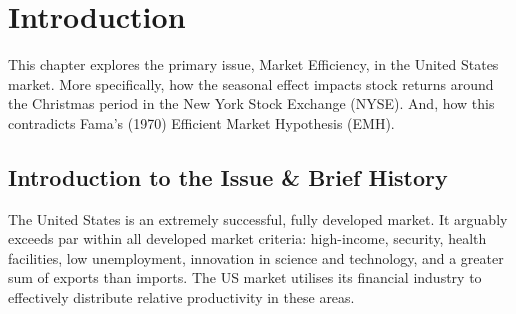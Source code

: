 \documentclass[11pt, english]{article}
\begin{document}
%

	\renewcommand{\contentsname}{Table of Contents}

	\tableofcontents

\newpage

	\listoftables

\newpage

	\listoffigures

\newpage


	\section{Introduction}\label{ch1}

	This chapter explores the primary issue, Market Efficiency, in the United States market. More specifically, how the seasonal effect impacts stock returns around the Christmas period in the New York Stock Exchange (NYSE). And, how this contradicts Fama’s (1970) Efficient Market Hypothesis (EMH). 

	\subsection{Introduction to the Issue \& Brief History}

	The United States is an extremely successful, fully developed market. It arguably exceeds par within all developed market criteria: high-income, security, health facilities, low unemployment, innovation in science and technology, and a greater sum of exports than imports. The US market utilises its financial industry to effectively distribute relative productivity in these areas.\\
\end{document}
